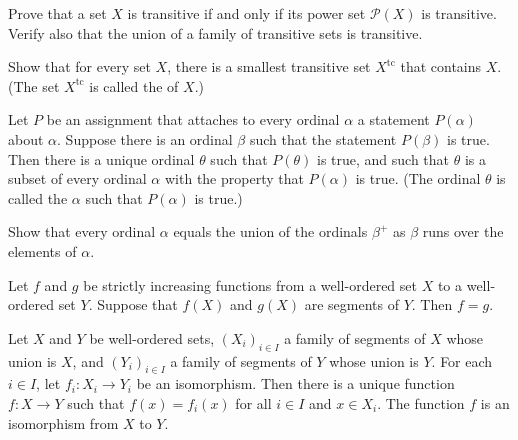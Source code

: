 \documentclass{article}
\begin{document}
\begin{exercise}
  \label{exe:565zdnmj}
  Prove that a set \(X\) is transitive if and only if its power set
  \(\mathcal{P}(X)\) is transitive.  Verify also that the union of a
  family of transitive sets is transitive.
\end{exercise}

\begin{exercise}
  \label{exe:v7uvzogi}
  Show that for every set \(X\), there is a smallest transitive set
  \(X^{\mathrm{tc}}\) that contains \(X\).  (The set
  \(X^{\mathrm{tc}}\) is called the  of
  \(X\).)
\end{exercise}

\begin{exercise}
  \label{exe:zgqzqjo2}
  Let \(P\) be an assignment that attaches to every ordinal \(\alpha\)
  a statement \(P(\alpha)\) about \(\alpha\).  Suppose there is an
  ordinal \(\beta\) such that the statement \(P(\beta)\) is true.
  Then there is a unique ordinal \(\theta\) such that \(P(\theta)\) is
  true, and such that \(\theta\) is a subset of every ordinal
  \(\alpha\) with the property that \(P(\alpha)\) is true.  (The
  ordinal \(\theta\) is called the 
  \(\alpha\) such that \(P(\alpha)\) is true.)
\end{exercise}

\begin{exercise}
  \label{exe:qgdrw0j7}
  Show that every ordinal \(\alpha\) equals the union of the ordinals
  \(\beta^+\) as \(\beta\) runs over the elements of \(\alpha\).
\end{exercise}

\begin{exercise}
  \label{exe:owfnmkbo}
  Let \(f\) and \(g\) be strictly increasing functions from a
  well-ordered set \(X\) to a well-ordered set \(Y\).  Suppose that
  \(f(X)\) and \(g(X)\) are segments of \(Y\).  Then \(f = g\).
\end{exercise}

\begin{exercise}
  \label{exe:mybmksm1}
  Let \(X\) and \(Y\) be well-ordered sets, \((X_i)_{i \in I}\) a
  family of segments of \(X\) whose union is \(X\), and
  \((Y_i)_{i \in I}\) a family of segments of \(Y\) whose union is
  \(Y\).  For each \(i \in I\), let \(f_i : X_i \to Y_i\) be an
  isomorphism.  Then there is a unique function \(f : X \to Y\) such
  that \(f(x) = f_i(x)\) for all \(i \in I\) and \(x \in X_i\).  The
  function \(f\) is an isomorphism from \(X\) to \(Y\).
\end{exercise}
\end{document}
